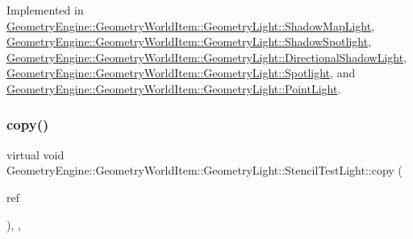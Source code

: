 Implemented in \mbox{\hyperlink{class_geometry_engine_1_1_geometry_world_item_1_1_geometry_light_1_1_shadow_map_light_a48eb6af2e6bb8487568ee4265fbc49ee}{Geometry\+Engine\+::\+Geometry\+World\+Item\+::\+Geometry\+Light\+::\+Shadow\+Map\+Light}}, \mbox{\hyperlink{class_geometry_engine_1_1_geometry_world_item_1_1_geometry_light_1_1_shadow_spotlight_a0ea8fd05d26f6e780d352168c28f940d}{Geometry\+Engine\+::\+Geometry\+World\+Item\+::\+Geometry\+Light\+::\+Shadow\+Spotlight}}, \mbox{\hyperlink{class_geometry_engine_1_1_geometry_world_item_1_1_geometry_light_1_1_directional_shadow_light_ae5016cad41a62c4c870a942acc3f9afe}{Geometry\+Engine\+::\+Geometry\+World\+Item\+::\+Geometry\+Light\+::\+Directional\+Shadow\+Light}}, \mbox{\hyperlink{class_geometry_engine_1_1_geometry_world_item_1_1_geometry_light_1_1_spotlight_a7feb062f72b8110cf7d8d614d2daad92}{Geometry\+Engine\+::\+Geometry\+World\+Item\+::\+Geometry\+Light\+::\+Spotlight}}, and \mbox{\hyperlink{class_geometry_engine_1_1_geometry_world_item_1_1_geometry_light_1_1_point_light_a68321b758cff76fa55f3cd5ef2824035}{Geometry\+Engine\+::\+Geometry\+World\+Item\+::\+Geometry\+Light\+::\+Point\+Light}}.

\mbox{\label{class_geometry_engine_1_1_geometry_world_item_1_1_geometry_light_1_1_stencil_test_light_aa17706b35df8267c7421725548c7f399}} 
\subsubsection{\texorpdfstring{copy()}{copy()}}
{\footnotesize\ttfamily virtual void Geometry\+Engine\+::\+Geometry\+World\+Item\+::\+Geometry\+Light\+::\+Stencil\+Test\+Light\+::copy (\begin{DoxyParamCaption}\item[{const \mbox{\hyperlink{class_geometry_engine_1_1_geometry_world_item_1_1_geometry_light_1_1_stencil_test_light}{Stencil\+Test\+Light}} \&}]{ref }\end{DoxyParamCaption})\hspace{0.3cm}{\ttfamily [inline]}, {\ttfamily [protected]}, {\ttfamily [virtual]}}

